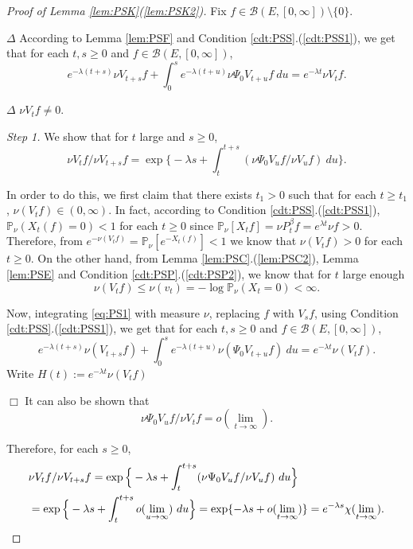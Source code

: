 \documentclass[12pt,a4paper]{amsart}
\numberwithin{equation}{section}
\theoremstyle{plain}
\theoremstyle{definition}
\begin{document}
\begin{proof}[Proof of Lemma \ref{lem:PSK}(\ref{lem:PSK2})]

  Fix $f\in \mathcal B(E,[0,\infty]) \setminus\{0\}$.

$\Delta$ According to Lemma \ref{lem:PSF} and Condition \ref{cdt:PSS}.(\ref{cdt:PSS1}), we get that for each $t,s\geq 0$ and $f\in \mathcal B(E,[0,\infty])$,
\[
  e^{-\lambda (t+s)}\nu V_{t+s}f + \int_0^s e^{-\lambda (t+u)}\nu \Psi_0 V_{t+u} f~du
  = e^{-\lambda t}\nu V_tf.
\]

$\Delta$ $\nu V_t f \neq 0$.

  
\emph{Step 1.}
We show that for $t$ large and $s\geq 0$,
\[
  \nu V_tf / \nu V_{t+s}f 
  = \exp\Big\{ -\lambda s +  \int_t^{t+s} (\nu \Psi_0 V_u f/ \nu V_uf) ~du \Big\}.
\]

In order to do this, we first claim that there exists $t_1 > 0$ such that for each $t\geq t_1$, $\nu (V_tf) \in (0,\infty)$.
In fact, according to Condition \ref{cdt:PSS}.(\ref{cdt:PSS1}), $\mathbb P_\nu(X_t (f) = 0)< 1$ for each $t\geq 0$ since  $\mathbb P_\nu[X_t f] = \nu P_t^\beta f = e^{\lambda t}\nu f>0$. 
Therefore, from $e^{-\nu (V_t f)} = \mathbb P_\nu[e^{-X_t (f)}] < 1$ we know that $\nu (V_tf) > 0$ for each $t\geq 0$.  
On the other hand, from Lemma \ref{lem:PSC}.(\ref{lem:PSC2}), Lemma \ref{lem:PSE} and Condition \ref{cdt:PSP}.(\ref{cdt:PSP2}), we know that for $t$ large enough
\[
\nu (V_tf) \leq \nu (v_t) = -\log \mathbb P_\nu(X_t = 0)< \infty.
\] 

Now, integrating \eqref{eq:PS1} with measure $\nu$, replacing $f$ with $V_sf$, using Condition \ref{cdt:PSS}.(\ref{cdt:PSS1}), we get that for each $t,s\geq 0$ and $f\in \mathcal B(E,[0,\infty])$,
\[
  e^{-\lambda (t+s)}\nu (V_{t+s}f) + \int_0^s e^{-\lambda (t+u)}\nu (\Psi_0 V_{t+u} f) ~du
  = e^{-\lambda t}\nu (V_tf).
\]
Write $H(t):= e^{- \lambda t}\nu(V_tf)$
 

$\Box$ It can also be shown that 
\[
\nu\Psi_0V_uf / \nu V_tf
= o(\lim_{t\to \infty}).
\]

Therefore, for each $s\geq 0$, 
\begin{align}
  & \nu V_tf / \nu V_{t+s}f 
    = \exp\Big\{ -\lambda s +  \int_t^{t+s} (\nu \Psi_0 V_u f/ \nu V_uf) ~du \Big\}  
  \\ & = \exp\Big\{ -\lambda s +  \int_t^{t+s}  o(\lim_{u\to \infty}) ~du \Big\}
   = \exp\{ -\lambda s +  o(\lim_{t\to \infty}) \}
   = e^{- \lambda s} \chi(\lim_{t\to \infty}).
       \qedhere
\end{align}
\end{proof}
\end{document}
